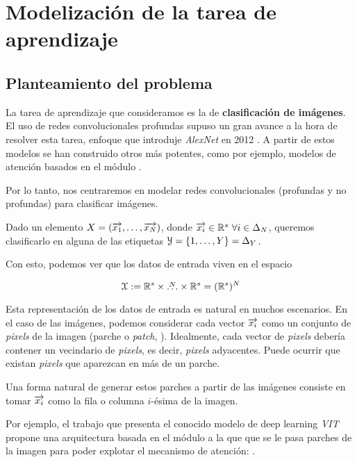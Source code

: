 \chapter{Modelización de la tarea de aprendizaje} \label{ch:tarea_aprendizaje}

\section{Planteamiento del problema} \label{seq:planteamiento_problema}

La tarea de aprendizaje que consideramos es la de \textbf{clasificación de imágenes}. El uso de redes convolucionales profundas supuso un gran avance a la hora de resolver esta tarea, enfoque que introduje \textit{AlexNet} en 2012 \cite{matematicas:alexnet_original_paper}. A partir de estos modelos se han construido otros más potentes, como por ejemplo, modelos de atención basados en el módulo .

Por lo tanto, nos centraremos en modelar redes convolucionales (profundas y no profundas) para clasificar imágenes.

Dado un elemento $X = (\overrightarrow{x_1}, \ldots, \overrightarrow{x_N})$, donde $\nv{x_i} \in \R^s \ \forall i \in \deltaset{N}$, queremos clasificarlo en alguna de las etiquetas $\mathcal{Y} = \{1, \ldots, Y \} = \Delta_{Y}$.

Con esto, podemos ver que los datos de entrada viven en el espacio

$$\mathcal{X} := \mathbb{R}^s \times \overset{N}{\ldots} \times \mathbb{R}^s = (\mathbb{R}^s)^N$$

Esta representación de los datos de entrada es natural en muchos escenarios. En el caso de las imágenes, podemos considerar cada vector $\overrightarrow{x_i}$ como un conjunto de \textit{pixels} de la imagen (parche o \textit{patch}, \cite{matematicas:principal}). Idealmente, cada vector de \textit{pixels} debería contener un vecindario de \textit{pixels}, es decir, \textit{pixels} adyacentes. Puede ocurrir que existan \textit{pixels} que aparezcan en más de un parche.

Una forma natural de generar estos parches a partir de las imágenes consiste en tomar $\overrightarrow{x_i}$ como la fila o columna $i$-ésima de la imagen.

Por ejemplo, el trabajo que presenta el conocido modelo  de deep learning \textit{VIT} propone una arquitectura basada en el módulo  a la que que se le pasa parches de la imagen para poder explotar el mecanismo de atención:  \cite{matematicas:vit}.

